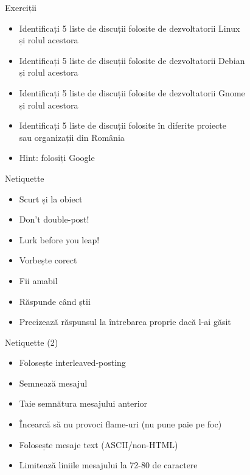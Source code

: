 \documentclass{beamer}
\begin{document}
    \begin{frame}{Exerciții}
    \begin{itemize}
    \setlength{\itemsep}{0.5cm}
    \item Identificați 5 liste de discuții folosite de dezvoltatorii Linux \\
        și rolul acestora
    \item Identificați 5 liste de discuții folosite de dezvoltatorii Debian \\
        și rolul acestora
    \item Identificați 5 liste de discuții folosite de dezvoltatorii Gnome \\
        și rolul acestora
    \item Identificați 5 liste de discuții folosite în diferite proiecte \\
        sau organizații din România
    \item Hint: folosiți Google
    \end{itemize}
    \end{frame}

    \begin{frame}{Netiquette}
    \begin{itemize}
    \setlength{\itemsep}{0.5cm}
    \item<2-> Scurt și la obiect
    \item<3-> Don't double-post!
    \item<4-> Lurk before you leap!
    \item<5-> Vorbește corect
    \item<6-> Fii amabil
    \item<7-> Răspunde când știi
    \item<8-> Precizează răspunsul la întrebarea proprie dacă l-ai găsit
    \end{itemize}
    \end{frame}

    \begin{frame}{Netiquette (2)}
    \begin{itemize}
    \setlength{\itemsep}{0.5cm}
    \item<2-> Folosește interleaved-posting
    \item<3-> Semnează mesajul
    \item<4-> Taie semnătura mesajului anterior
    \item<5-> Încearcă să nu provoci flame-uri (nu pune paie pe foc)
    \item<6-> Folosește mesaje text (ASCII/non-HTML)
    \item<7-> Limitează liniile mesajului la 72-80 de caractere
    \end{itemize}
    \end{frame}
\end{document}
